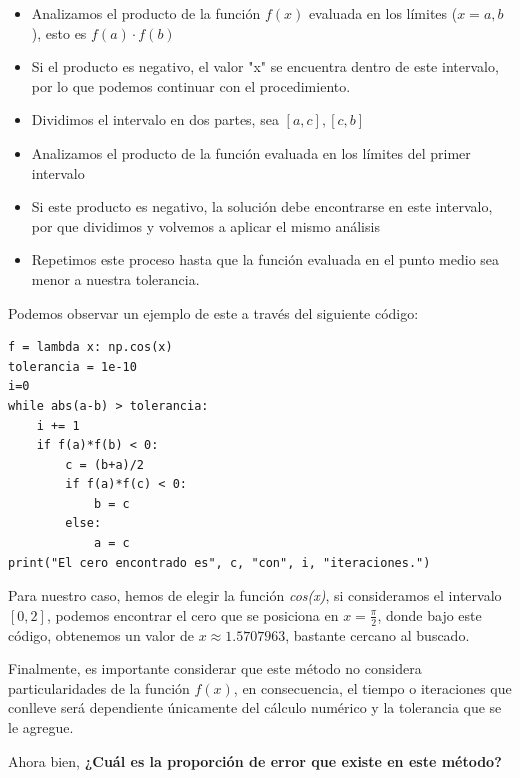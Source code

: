 \begin{itemize}
    \item Analizamos el producto de la función $f(x)$ evaluada en los límites ($x = a,b$), esto es $f(a) \cdot f(b)$
    \item Si el producto es negativo, el valor "x" se encuentra dentro de este intervalo, por lo que podemos continuar con el procedimiento.
    \item Dividimos el intervalo en dos partes, sea $[a,c], [c,b]$
    \item Analizamos el producto de la función evaluada en los límites del primer intervalo
    \item Si este producto es negativo, la solución debe encontrarse en este intervalo, por que dividimos y volvemos a aplicar el mismo análisis
    \item Repetimos este proceso hasta que la función evaluada en el punto medio sea menor a nuestra tolerancia.

\end{itemize}

Podemos observar un ejemplo de este a través del siguiente código:
\begin{lstlisting}
f = lambda x: np.cos(x)
tolerancia = 1e-10
i=0
while abs(a-b) > tolerancia:
    i += 1
    if f(a)*f(b) < 0:
        c = (b+a)/2
        if f(a)*f(c) < 0:
            b = c
        else: 
            a = c
print("El cero encontrado es", c, "con", i, "iteraciones.")
\end{lstlisting}

Para nuestro caso, hemos de elegir la función \textit{cos(x)}, si consideramos el intervalo $[0,2]$, podemos encontrar el cero que se posiciona en $x = \frac{\pi}{2}$, donde bajo este código, obtenemos un valor de $x \approx 1.5707963$, bastante cercano al buscado.

Finalmente, es importante considerar que este método no considera particularidades de la función $f(x)$, en consecuencia, el tiempo o iteraciones que conlleve será dependiente únicamente del cálculo numérico y la tolerancia que se le agregue.

Ahora bien, \textbf{¿Cuál es la proporción de error que existe en este método?}
